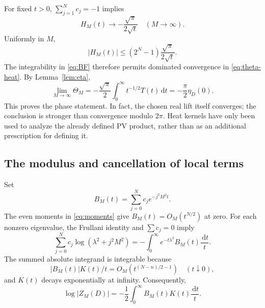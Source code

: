 \documentclass[11pt,a4paper]{article}
\theoremstyle{remark}
\newcommand{\dd}{\,\mathrm d}
\numberwithin{equation}{section}
\begin{document}
For fixed $t>0$, $\sum_{j=1}^Nc_j=-1$ implies
\begin{equation}\label{eq:H-limit}
 H_M(t)\longrightarrow-\frac{\sqrt\pi}{2\sqrt t}
 \quad(M\to\infty).
\end{equation}
Uniformly in $M$,
\begin{equation}\label{eq:H-majorant}
 |H_M(t)|\le(2^N-1)\frac{\sqrt\pi}{2\sqrt t}.
\end{equation}
The integrability in \eqref{eq:BF} therefore permits dominated
convergence in \eqref{eq:theta-heat}. By Lemma~\ref{lem:eta},
\begin{equation}\label{eq:theta-limit}
 \lim_{M\to\infty}\Theta_M
 =-\frac{\sqrt\pi}{2}\int_0^\infty t^{-1/2}T(t)\dd t
 =-\frac\pi2\eta_D(0).
\end{equation}
This proves the phase statement. In fact, the chosen real lift itself
converges; the conclusion is stronger than convergence modulo $2\pi$.
Heat kernels have only been used to analyze the already defined PV
product, rather than as an additional prescription for defining it.

\subsection{The modulus and cancellation of local terms}

Set
\begin{equation}\label{eq:B}
 B_M(t)=\sum_{j=0}^Nc_j e^{-j^2M^2t}.
\end{equation}
The even moments in \eqref{eq:moments} give
$B_M(t)=O_M(t^{N/2})$ at zero. For each nonzero eigenvalue, the
Frullani identity and $\sum c_j=0$ imply
\begin{equation}\label{eq:frullani}
 \sum_{j=0}^Nc_j\log(\lambda^2+j^2M^2)
 =-\int_0^\infty e^{-t\lambda^2}B_M(t)\frac{\dd t}{t}.
\end{equation}
The summed absolute integrand is integrable because
\[
 |B_M(t)|K(t)/t=O_M(t^{(N-n)/2-1})\quad(t\downarrow0),
\]
and $K(t)$ decays exponentially at infinity. Consequently,
\begin{equation}\label{eq:log-modulus}
 \log|Z_M(D)|=-\frac12\int_0^\infty B_M(t)K(t)\frac{\dd t}{t}.
\end{equation}
\end{document}
